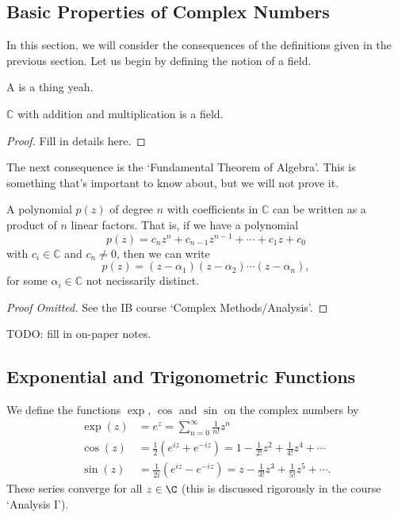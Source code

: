 \documentclass[a4]{scrartcl}
\begin{document}
\subsection{Basic Properties of Complex Numbers}

In this section, we will consider the consequences of the definitions given in the previous section.
Let us begin by defining the notion of a field.

\begin{definition}
	A  is a thing yeah.
\end{definition}

\begin{proposition}
	$\mathbb{C}$ with addition and multiplication is a field.
\end{proposition}
\begin{proof}
	Fill in details here.
\end{proof}

The next consequence is the `Fundamental Theorem of Algebra'.
This is something that's important to know about, but we will not prove it.

\begin{theorem}
	A polynomial $p(z)$ of degree $n$ with coefficients in $\mathbb{C}$ can be written as a product of $n$ linear factors. That is, if we have a polynomial
	$$
	p(z) = c_n z^n + c_{n - 1} z^{n - 1} + \cdots + c_1 z + c_0
	$$
	with $c_i \in \mathbb{C}$ and $c_n \neq 0$, then we can write
	$$
	p(z) = (z - \alpha_1) (z - \alpha_2) \cdots (z - \alpha_n),
	$$ 
	for some $\alpha_i \in \mathbb{C}$ not necissarily distinct.
\end{theorem}
\begin{proof}[Proof Omitted]
	See the IB course `Complex Methods/Analysis'.
\end{proof}

{\color{red} TODO: fill in on-paper notes.}

\subsection{Exponential and Trigonometric Functions}

We define the functions $\exp$, $\cos$ and $\sin$ on the complex numbers by
\begin{align*}
	\exp(z) &= e^z = \sum_{n = 0}^\infty \frac{1}{n!} z^n \\
	\cos (z) &= \frac{1}{2}(e^{iz} + e^{-iz}) = 1 - \frac{1}{2!} z^2 + \frac{1}{4!} z^4 + \cdots \\
	\sin (z) &= \frac{1}{2i}(e^{iz} - e^{-iz}) = z - \frac{1}{3!}z^3 + \frac{1}{5!} z^5 + \cdots.
\end{align*}
These series converge for all $z \in \C$ (this is discussed rigorously in the course `Analysis I').
\end{document}

